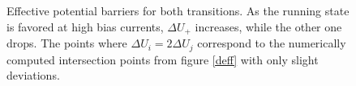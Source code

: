 \documentclass[12pt,a4paper]{article}
\begin{document}
\begin{figure}[H]
	\hspace*{-0.5cm}
	\caption{Effective potential barriers for both transitions. As the running state is favored at high bias currents, $\Delta U_+$ increases, while the other one drops. The points where $\Delta U_i=2\Delta U_j$ correspond to the numerically computed intersection points from figure \ref{deff} with only slight deviations.}
\end{figure}
\end{document}
